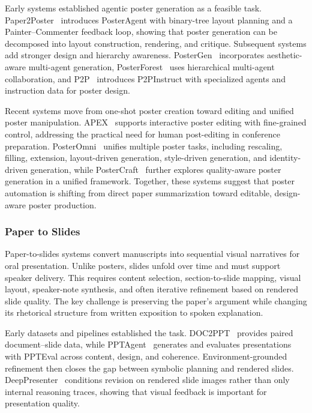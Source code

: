 \documentclass{llmxive}
\begin{document}
Early systems established agentic poster generation as a feasible task. Paper2Poster~\cite{paper2poster2025} introduces PosterAgent with binary-tree layout planning and a Painter--Commenter feedback loop, showing that poster generation can be decomposed into layout construction, rendering, and critique. Subsequent systems add stronger design and hierarchy awareness. PosterGen~\cite{postergen2025} incorporates aesthetic-aware multi-agent generation, PosterForest~\cite{choi2025posterforest} uses hierarchical multi-agent collaboration, and P2P~\cite{p2p2025} introduces P2PInstruct with specialized agents and instruction data for poster design.

Recent systems move from one-shot poster creation toward editing and unified poster manipulation. APEX~\cite{apex2026} supports interactive poster editing with fine-grained control, addressing the practical need for human post-editing in conference preparation. PosterOmni~\cite{posteromni2026} unifies multiple poster tasks, including rescaling, filling, extension, layout-driven generation, style-driven generation, and identity-driven generation, while PosterCraft~\cite{postercraft2026} further explores quality-aware poster generation in a unified framework. Together, these systems suggest that poster automation is shifting from direct paper summarization toward editable, design-aware poster production.



\subsubsection{Paper to Slides}
\label{sec:paper2slides}

Paper-to-slides systems convert manuscripts into sequential visual narratives for oral presentation. Unlike posters, slides unfold over time and must support speaker delivery. This requires content selection, section-to-slide mapping, visual layout, speaker-note synthesis, and often iterative refinement based on rendered slide quality. The key challenge is preserving the paper's argument while changing its rhetorical structure from written exposition to spoken explanation.

Early datasets and pipelines established the task. DOC2PPT~\cite{doc2ppt2022} provides paired document--slide data, while PPTAgent~\cite{pptagent2025} generates and evaluates presentations with PPTEval across content, design, and coherence. Environment-grounded refinement then closes the gap between symbolic planning and rendered slides. DeepPresenter~\cite{deeppresenter2026} conditions revision on rendered slide images rather than only internal reasoning traces, showing that visual feedback is important for presentation quality.
\end{document}
